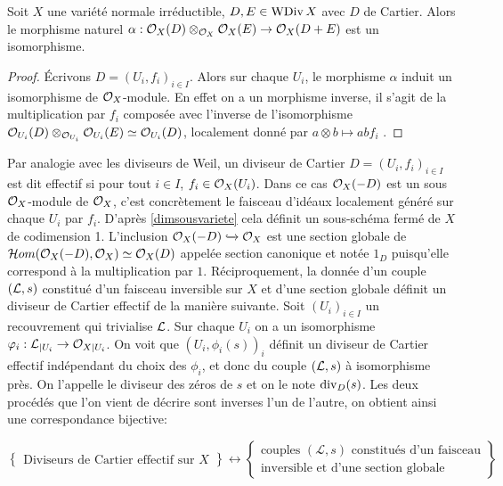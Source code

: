 \begin{prop}\label{isomophismeOTimes}
Soit $X$ une variété normale irréductible, $D,E\in\operatorname{WDiv} X$ avec $D$ de Cartier. Alors le morphisme naturel $\alpha:\mathcal{O}_X(D)\otimes_{\mathcal{O}_X}\mathcal{O}_X(E)\rightarrow \mathcal{O}_X(D+E)$ est un isomorphisme.
\end{prop}
\begin{proof}
Écrivons $D=(U_i,f_i)_{i\in I}$. Alors sur chaque $U_i$, le morphisme $\alpha$ induit un isomorphisme de $\mathcal{O}_X$-module. En effet on a un morphisme inverse, il s'agit de la multiplication par $f_i$ composée avec l'inverse de l'isomorphisme $\mathcal{O}_{U_i}(D)\otimes_{\mathcal{O}_{U_i}}\mathcal{O}_{U_i}(E) \simeq \mathcal{O}_{U_i}(D)$, localement donné par $a\otimes b\mapsto abf_i$ .
\end{proof}

Par analogie avec les diviseurs de Weil, un diviseur de Cartier $D=(U_i, f_i)_{i\in I}$ est dit effectif si pour tout $i\in I$, $f_i\in \mathcal{O}_X(U_i)$. Dans ce cas $\mathcal{O}_X(-D)$ est un sous $\mathcal{O}_X$-module de $\mathcal{O}_X$, c'est concrètement le faisceau d'idéaux localement généré sur chaque $U_i$ par $f_i$. D'après \ref{dimsousvariete} cela définit un sous-schéma fermé de $X$ de codimension 1. L'inclusion $\mathcal{O}_X(-D)\xhookrightarrow{} \mathcal{O}_X$ est une section globale de $\mathcal{H} om(\mathcal{O}_X(-D), \mathcal{O}_X)\simeq \mathcal{O}_X(D)$ appelée section canonique et notée $1_D$ puisqu'elle correspond à la multiplication par $1$. Réciproquement, la donnée d'un couple $(\mathcal{L}, s)$ constitué d'un faisceau inversible sur $X$ et d'une section globale définit un diviseur de Cartier effectif de la manière suivante. Soit $(U_i)_{i\in I}$ un recouvrement qui trivialise $\mathcal{L}$. Sur chaque $U_i$ on a un isomorphisme $\varphi_i:\mathcal{L}_{|U_i}\rightarrow\mathcal{O}_{X|U_i}$. On voit que $(U_i,\phi_i(s))_i$ définit un diviseur de Cartier effectif indépendant du choix des $\phi_i$, et donc du couple $(\mathcal{L},s)$ à isomorphisme près. On l'appelle le diviseur des zéros de $s$ et on le note $\operatorname{div}_D(s)$. Les deux procédés que l'on vient de décrire sont inverses l'un de l'autre, on obtient ainsi une correspondance bijective:

$$
\left\{
\begin{matrix}
\text{Diviseurs de Cartier effectif sur }X
\end{matrix}
\right\}
\leftrightarrow
\left\{
\begin{matrix}
\text{couples }(\mathcal{L}, s)\text{ constitués d'un faisceau}\\
\text{inversible et d'une section globale}
\end{matrix}
\right\}
$$

